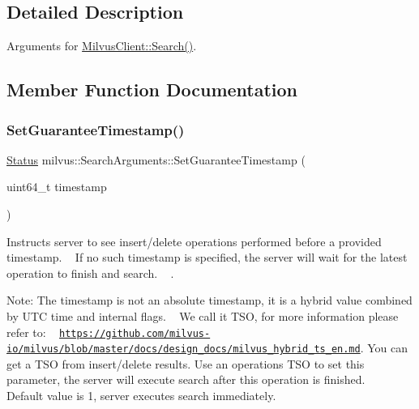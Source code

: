 \subsection{Detailed Description}
Arguments for \hyperlink{classmilvus_1_1_milvus_client_a46c70fc2b7c386003babd90e02b299d1}{Milvus\+Client\+::\+Search()}. 

\subsection{Member Function Documentation}
\mbox{\label{classmilvus_1_1_search_arguments_ac2e9e3e820db51c764c816b14b6e717f}} 
\subsubsection{\texorpdfstring{Set\+Guarantee\+Timestamp()}{SetGuaranteeTimestamp()}}
{\footnotesize\ttfamily \hyperlink{classmilvus_1_1_status}{Status} milvus\+::\+Search\+Arguments\+::\+Set\+Guarantee\+Timestamp (\begin{DoxyParamCaption}\item[{uint64\+\_\+t}]{timestamp }\end{DoxyParamCaption})\hspace{0.3cm}{\ttfamily [inline]}}



Instructs server to see insert/delete operations performed before a provided timestamp. ~\newline
If no such timestamp is specified, the server will wait for the latest operation to finish and search. ~\newline
. 

Note\+: The timestamp is not an absolute timestamp, it is a hybrid value combined by U\+TC time and internal flags. ~\newline
 We call it T\+SO, for more information please refer to\+: ~\newline
\href{https://github.com/milvus-io/milvus/blob/master/docs/design_docs/milvus_hybrid_ts_en.md}{\tt https\+://github.\+com/milvus-\/io/milvus/blob/master/docs/design\+\_\+docs/milvus\+\_\+hybrid\+\_\+ts\+\_\+en.\+md}. You can get a T\+SO from insert/delete results. Use an operation\textquotesingle{}s T\+SO to set this parameter, the server will execute search after this operation is finished. ~\newline
 Default value is 1, server executes search immediately. \mbox{\label{classmilvus_1_1_search_arguments_a4fae6c38804ea381a7c5c9ec21313c2a}} 
